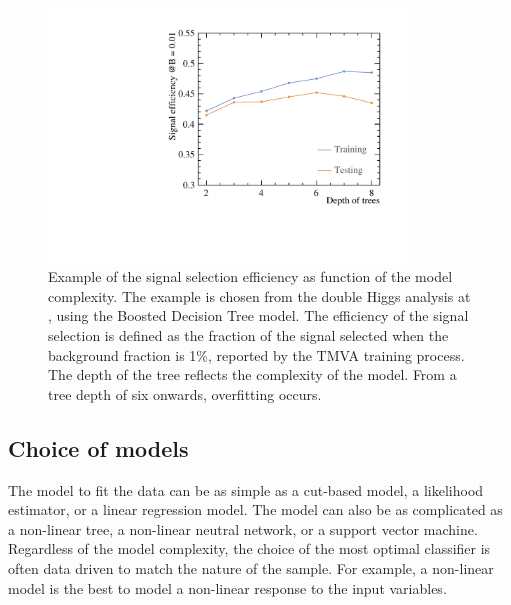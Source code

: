 

\begin{figure}[!htbp]
\includegraphics[width=0.85\textwidth]{doubleHiggs/DepthOfTrees.pdf}
\caption{Example of the signal selection efficiency as function of the model complexity. The example is chosen from the double Higgs analysis at , using the Boosted Decision Tree model. The efficiency of the signal selection is defined as the  fraction of the signal selected when the background fraction is 1\%, reported by the TMVA training process. The depth of the tree  reflects the complexity of the model.  From a tree depth of six onwards, overfitting occurs.}
\label{fig:doubleHiggsMVAovertraining}
\end{figure}


\subsection{Choice of models}

The model to fit the data can be as simple as a cut-based model, a likelihood estimator, or a linear regression model. The model can also be as complicated as a non-linear tree, a non-linear neutral network, or a support vector machine. Regardless of the model complexity, the choice of the most optimal classifier is often data driven to match the nature of the sample. For example, a non-linear model is the best to model a non-linear response to the input variables.

